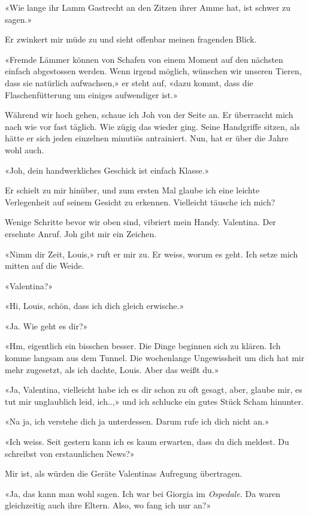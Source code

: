 «Wie lange ihr Lamm Gastrecht an den Zitzen ihrer Amme hat, ist schwer
zu sagen.»

Er zwinkert mir müde zu und sieht offenbar meinen fragenden Blick.

«Fremde Lämmer können von Schafen von einem Moment auf den nächsten
einfach abgestossen werden. Wenn irgend möglich, wünschen wir unseren
Tieren, dass sie natürlich aufwachsen,» er steht auf, «dazu kommt, dass
die Flaschenfütterung um einiges aufwendiger ist.»

Während wir hoch gehen, schaue ich Joh von der Seite an. Er überrascht
mich nach wie vor fast täglich. Wie zügig das wieder ging. Seine
Handgriffe sitzen, als hätte er sich jeden einzelnen minutiös
antrainiert. Nun, hat er über die Jahre wohl auch.

«Joh, dein handwerkliches Geschick ist einfach Klasse.»

Er schielt zu mir hinüber, und zum ersten Mal glaube ich eine leichte
Verlegenheit auf seinem Gesicht zu erkennen. Vielleicht täusche ich
mich?

Wenige Schritte bevor wir oben sind, vibriert mein Handy. Valentina. Der
ersehnte Anruf. Joh gibt mir ein Zeichen.

«Nimm dir Zeit, Louis,» ruft er mir zu. Er weiss, worum es geht. Ich
setze mich mitten auf die Weide.

«Valentina?»

«Hi, Louis, schön, dass ich dich gleich erwische.»

«Ja. Wie geht es dir?»

«Hm, eigentlich ein bisschen besser. Die Dinge beginnen sich zu klären.
Ich komme langsam aus dem Tunnel. Die wochenlange Ungewissheit um dich
hat mir mehr zugesetzt, als ich dachte, Louis. Aber das weißt du.»

«Ja, Valentina, vielleicht habe ich es dir schon zu oft gesagt, aber,
glaube mir, es tut mir unglaublich leid, ich..,» und ich schlucke ein
gutes Stück Scham hinunter.

«Na ja, ich verstehe dich ja unterdessen. Darum rufe ich dich nicht an.»

«Ich weiss. Seit gestern kann ich es kaum erwarten, dass du dich
meldest. Du schreibst von erstaunlichen News?»

Mir ist, als würden die Geräte Valentinas Aufregung übertragen.

«Ja, das kann man wohl sagen. Ich war bei Giorgia im \emph{Ospedale.} Da
waren gleichzeitig auch ihre Eltern. Also, wo fang ich nur an?»

